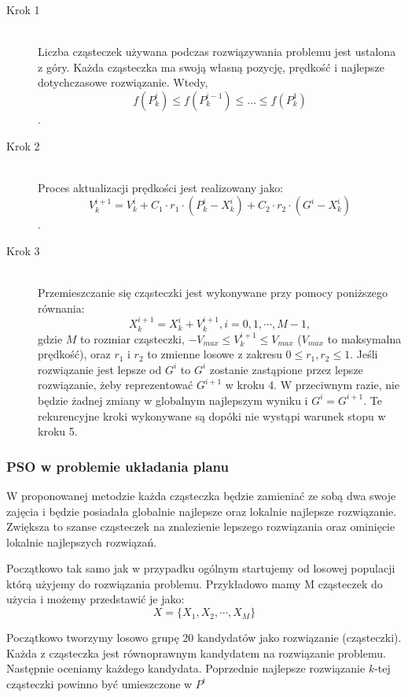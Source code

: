 \begin{description}
  \item[Krok 1] \hfill \\
Liczba cząsteczek używana podczas rozwiązywania problemu jest ustalona z góry. Każda cząsteczka ma swoją własną pozycję, prędkość i najlepsze dotychczasowe rozwiązanie. Wtedy,
  \[f(P^{i}_{k}) \le f(P^{i-1}_{k}) \le \ldots \le f(P^{1}_{k})\].

  \item[Krok 2] \hfill \\
Proces aktualizacji prędkości jest realizowany jako:
\[V^{i+1}_{k} = V^{i}_{k} + C_{1} \cdot r_{1} \cdot (P^{i}_{k} - X^{i}_{k}) + C_{2} \cdot r_{2} \cdot (G^{i} - X^{i}_{k})\].
  \item[Krok 3] \hfill \\
Przemieszczanie się cząsteczki jest wykonywane przy pomocy poniższego równania:
\[X^{i+1}_{k} = X^{i}_{k} + V^{i+1}_{k}, i = 0,1,\cdots, M-1,\]
gdzie $M$ to rozmiar cząsteczki, $-V_{max} \le V^{i+1}_{k} \le V_{max}$ ($V_{max}$ to maksymalna prędkość), oraz $r_{1}$ i $r_{2}$ to zmienne losowe z zakresu $0 \le r_{1},r_{2} \le 1$. Jeśli rozwiązanie jest lepsze od $G^{i}$ to $G^{i}$ zostanie zastąpione przez lepsze rozwiązanie, żeby reprezentować $G^{i+1}$ w kroku 4. W przeciwnym razie, nie będzie żadnej zmiany w globalnym najlepszym wyniku i $G^{i} = G^{i+1}$. Te rekurencyjne kroki wykonywane są dopóki nie wystąpi warunek stopu w kroku 5.  
\end{description}

\subsubsection{PSO w problemie układania planu}
\par W proponowanej metodzie każda cząsteczka będzie zamieniać ze sobą dwa swoje zajęcia i będzie posiadała globalnie najlepsze oraz lokalnie najlepsze rozwiązanie. Zwiększa to szanse cząsteczek na znalezienie lepszego rozwiązania oraz ominięcie lokalnie najlepszych rozwiązań. 
\par Początkowo tak samo jak w przypadku ogólnym startujemy od losowej populacji którą użyjemy do rozwiązania problemu. Przykładowo mamy M cząsteczek do użycia i możemy przedstawić je jako:
\[X = \{X_{1},X_{2},\cdots,X_{M}\}\]

\par Początkowo tworzymy losowo grupę 20 kandydatów jako rozwiązanie (cząsteczki). Każda z cząsteczka jest równoprawnym kandydatem na rozwiązanie problemu. Następnie oceniamy każdego kandydata. Poprzednie najlepsze rozwiązanie $k$-tej cząsteczki powinno być umieszczone w $P^{i}$

